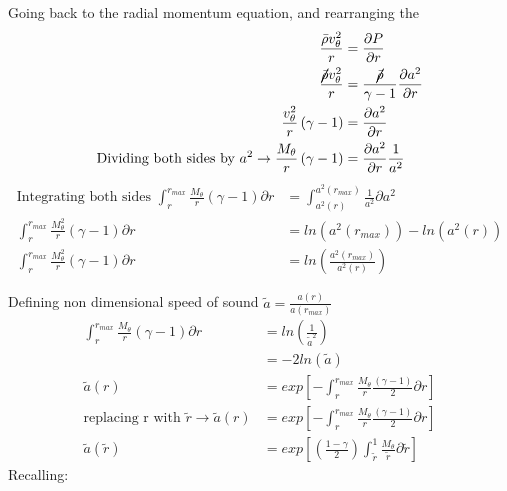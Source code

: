 \documentclass[12pt]{article}
\begin{document}
Going back to the radial momentum equation, and rearranging the 
\begin{align*}
\frac{\bar{\rho} v_{\theta}^2}{r} 
&=\frac{\partial P}{\partial r}\\
\frac{\cancel{\bar{\rho}} v_{\theta}^2}{r} 
&=\frac{\cancel{\bar{\rho}}}{\gamma -1}\frac{\partial a^2}{\partial r}\\
\frac{v_{\theta}^2}{r}\left(\gamma -1\right) &= \frac{\partial a^2}{\partial r}\\ \text{Dividing both sides by } a^2 \rightarrow \frac{M_{\theta}}{r}\left(\gamma - 1\right) &= \frac{\partial a^2}{\partial r} \frac{1}{a^2}
\end{align*}
\begin{align*}
\text{Integrating both sides } \int_{r}^{r_{max}}\frac{M_{\theta}}{r}\left(\gamma - 1\right){\partial r}  &=\int_{a^2(r)}^{a^2(r_{max})}\frac{1}{a^2}  {\partial a^2}\\
\int_{r}^{r_{max}}\frac{M^2_{\theta}}{r}\left(\gamma - 1\right){\partial r}  &=ln(a^2(r_{max})) - ln(a^2(r)) \\
\int_{r}^{r_{max}}\frac{M^2_{\theta}}{r}\left(\gamma - 1\right){\partial r}  &=ln\left(\frac{a^2(r_{max})}{a^2(r)}\right) 
\end{align*}

Defining non dimensional speed of sound $\tilde{a} = \frac{a(r)}{a(r_{max})}$
\begin{align*}
\int_{r}^{r_{max}}\frac{M_{\theta}}{r}\left(\gamma - 1\right){\partial r}  &=ln\left(\frac{1}{\tilde{a}^2}\right) \\
&= -2ln(\tilde{a})\\
\tilde{a}(r) &= exp\left[-\int_{r}^{r_{max}}\frac{M_{\theta}}{r}\frac{\left(\gamma - 1\right)}{2}{\partial r}\right] \\ \text{replacing r with }\tilde{r} \rightarrow \tilde{a}(r) &= exp\left[-\int_{r}^{r_{max}}\frac{M_{\theta}}{r}\frac{\left(\gamma - 1\right)}{2}{\partial r}\right]		\\
\tilde{a}(\tilde{r}) &= exp\left[\left(\frac{1 - \gamma}{2}\right)\int_{\tilde{r}}^{1}\frac{M_{\theta}}{\tilde{r}}{\partial \tilde{r}}\right]	
\end{align*}
Recalling:
\end{document}
